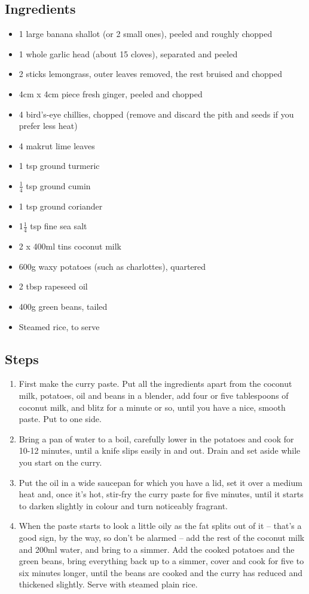 \documentclass{book}
\begin{document}
\subsection*{Ingredients}
\begin{itemize}
\item 1 large banana shallot (or 2 small ones), peeled and roughly chopped
\item 1 whole garlic head (about 15 cloves), separated and peeled
\item 2 sticks lemongrass, outer leaves removed, the rest bruised and chopped
\item 4cm x 4cm piece fresh ginger, peeled and chopped
\item 4 bird’s-eye chillies, chopped (remove and discard the pith and seeds if you prefer less heat)
\item 4 makrut lime leaves
\item 1 tsp ground turmeric
\item $\frac{1}{4}$ tsp ground cumin
\item 1 tsp ground coriander
\item 1$\frac{1}{4}$ tsp fine sea salt
\item 2 x 400ml tins coconut milk
\item 600g waxy potatoes (such as charlottes), quartered
\item 2 tbsp rapeseed oil
\item 400g green beans, tailed
\item Steamed rice, to serve
\end{itemize}

\subsection*{Steps}
\begin{enumerate}
\item First make the curry paste. Put all the ingredients apart from the coconut milk, potatoes, oil and beans in a blender, add four or five tablespoons of coconut milk, and blitz for a minute or so, until you have a nice, smooth paste. Put to one side.
\item Bring a pan of water to a boil, carefully lower in the potatoes and cook for 10-12 minutes, until a knife slips easily in and out. Drain and set aside while you start on the curry.
\item Put the oil in a wide saucepan for which you have a lid, set it over a medium heat and, once it’s hot, stir-fry the curry paste for five minutes, until it starts to darken slightly in colour and turn noticeably fragrant.
\item When the paste starts to look a little oily as the fat splits out of it – that’s a good sign, by the way, so don’t be alarmed – add the rest of the coconut milk and 200ml water, and bring to a simmer. Add the cooked potatoes and the green beans, bring everything back up to a simmer, cover and cook for five to six minutes longer, until the beans are cooked and the curry has reduced and thickened slightly. Serve with steamed plain rice.
\end{enumerate}
\newpage
\end{document}
